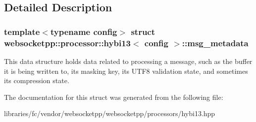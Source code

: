 \subsection{Detailed Description}
\subsubsection*{template$<$typename config$>$\newline
struct websocketpp\+::processor\+::hybi13$<$ config $>$\+::msg\+\_\+metadata}

This data structure holds data related to processing a message, such as the buffer it is being written to, its masking key, its U\+T\+F8 validation state, and sometimes its compression state. 

The documentation for this struct was generated from the following file\+:\begin{DoxyCompactItemize}
\item 
libraries/fc/vendor/websocketpp/websocketpp/processors/hybi13.\+hpp\end{DoxyCompactItemize}
